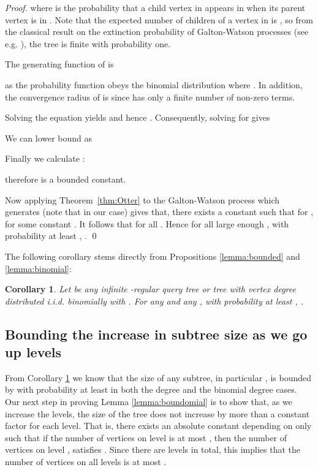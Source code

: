\documentclass[english, oribibl]{llncs}
\newtheorem{corollary}[theorem]{Corollary}
\begin{document}
\begin{proof}
where  is the probability that a child vertex in 
appears in  when its parent vertex is in .
Note that the expected number of children of a vertex in  is ,
so from the classical result on the extinction probability of Galton-Watson processes (see e.g. \cite{Har63}),
the tree  is finite with probability one.

The generating function of  is

as the probability function  obeys the binomial distribution 
where .
In addition, the convergence radius of  is 
since  has only a finite number of non-zero terms.



Solving the equation  yields
 and hence
.
Consequently, solving for  gives


We can lower bound  as


Finally we calculate :

therefore  is a bounded constant.





Now applying Theorem~\ref{thm:Otter} to the Galton-Watson process
which generates  (note that  in our case) gives that, there exists a constant 
such that for ,
 for some constant .
It follows that 
for all .
Hence for all large enough , with probability at least , . \qed
\end{proof}


The following corollary stems directly from Propositions  \ref{lemma:bounded} and \ref{lemma:binomial}:
\begin{corollary}\label{corr:boundomial}
Let  be  any infinite -regular query tree or tree with vertex degree distributed i.i.d. binomially with .
For any  and any ,
with probability at least , .
\end{corollary}





\subsection{Bounding the increase in subtree size as we go up levels}


\label{section:increase}

From Corollary \ref{corr:boundomial} we know that the size of any subtree, in particular ,
is bounded by  with probability at least 
in both the degree  and the binomial degree cases.
Our next step in proving
Lemma \ref{lemma:boundomial} 
is to show that, as we increase the levels,
the size of the tree does not increase by more than a constant factor for each level.
That is, there exists an absolute constant  depending on  only
such that if the number of vertices on level  is at most ,
then the number of vertices on level ,  satisfies
. Since there are  levels in total, this implies that
the number of vertices on all  levels is at most
.
\end{document}
